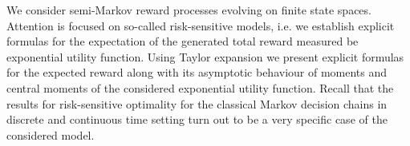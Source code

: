
\begin{Abstrakt}
    We consider semi-Markov reward processes evolving on finite state spaces. Attention is focused on so-called risk-sensitive models, i.e. we establish explicit formulas for the  expectation of the generated total reward measured be exponential utility function.  Using Taylor expansion we present explicit formulas for the expected reward along with its asymptotic behaviour of moments and central moments of the considered exponential utility function.  Recall that the results for risk-sensitive optimality for the classical Markov decision chains in discrete and continuous time setting turn out to be a very specific case of the considered model.
\end{Abstrakt}



\clearpage